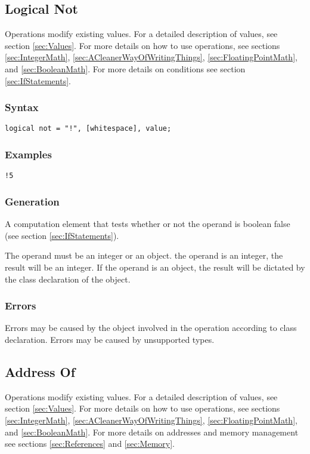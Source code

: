 \documentclass[10pt,a4paper]{article}
\begin{document}
\newpage




\subsection{Logical Not}
Operations modify existing values. For a detailed description of values, see section \ref{sec:Values}. For more details on how to use operations, see sections \ref{sec:IntegerMath}, \ref{sec:ACleanerWayOfWritingThings}, \ref{sec:FloatingPointMath}, and \ref{sec:BooleanMath}. For more details on conditions see section \ref{sec:IfStatements}.

\subsubsection{Syntax}
\begin{verbatim}
logical not = "!", [whitespace], value;
\end{verbatim}

\subsubsection{Examples}
\begin{verbatim}
!5
\end{verbatim}

\subsubsection{Generation}
A computation element that tests whether or not the operand is boolean false (see section \ref{sec:IfStatements}).

The operand must be an integer or an object. the operand is an integer, the result will be an integer. If the operand is an object, the result will be dictated by the class declaration of the object.

\subsubsection{Errors}
Errors may be caused by the object involved in the operation according to class declaration. Errors may be caused by unsupported types.

\newpage




\subsection{Address Of}
Operations modify existing values. For a detailed description of values, see section \ref{sec:Values}. For more details on how to use operations, see sections \ref{sec:IntegerMath}, \ref{sec:ACleanerWayOfWritingThings}, \ref{sec:FloatingPointMath}, and \ref{sec:BooleanMath}. For more details on addresses and memory management see sections \ref{sec:References} and \ref{sec:Memory}.
\end{document}
